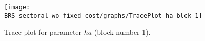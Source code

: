 \begin{figure}[H]
\centering
  \texttt{[image: BRS\_sectoral\_wo\_fixed\_cost/graphs/TracePlot\_ha\_blck\_1]}\\
    \caption{Trace plot for parameter ${ha}$ (block number 1).}
\end{figure}
